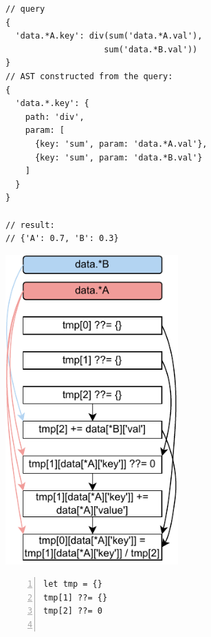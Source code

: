 \documentclass[runningheads]{llncs}
\begin{document}
\begin{figure}[t!]
\begin{subfigure}{\textwidth}
\begin{minipage}{0.33\textwidth}
\begin{lstlisting}[style=JavaScriptTiny, columns=flexible]
// query
{
  'data.*A.key': div(sum('data.*A.val'), 
                    sum('data.*B.val')) 
}
// AST constructed from the query:
{
  'data.*.key': {
    path: 'div',
    param: [
      {key: 'sum', param: 'data.*A.val'},
      {key: 'sum', param: 'data.*B.val'}
    ]
  }
}

// result:
// {'A': 0.7, 'B': 0.3}
\end{lstlisting}
\end{minipage}
\begin{minipage}{0.27\textwidth}
\hspace{1mm}
\includegraphics[width=0.73\textwidth]{images/intro_q3_ir.pdf}
\end{minipage}
\begin{minipage}{0.38\textwidth}
\begin{lstlisting}[style=JavaScriptTiny, columns=flexible, numbers=left, xleftmargin=2pt]
let tmp = {}
tmp[1] ??= {}
tmp[2] ??= 0


\end{lstlisting}
\end{minipage}
\end{subfigure}
\end{figure}
\end{document}

